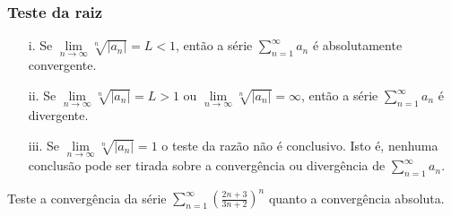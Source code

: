 \subsubsection{Teste da raiz} 
\begin{itemize}
	\item[i.]Se $\lim\limits_{n\rightarrow\infty} \sqrt[n]{\left|a_{n} \right| }=L<1$, então a série $\sum_{n=1}^{\infty}a_{n}$ é absolutamente convergente.
	\item[ii.]Se $\lim\limits_{n\rightarrow\infty} \sqrt[n]{\left|a_{n} \right| }=L>1$ ou $\lim\limits_{n\rightarrow\infty} \sqrt[n]{\left|a_{n} \right| }=\infty$, então a série $\sum_{n=1}^{\infty}a_{n}$ é divergente.
	\item[iii.]Se $\lim\limits_{n\rightarrow\infty} \sqrt[n]{\left|a_{n} \right| }=1$ o teste da razão não é conclusivo. Isto é, nenhuma conclusão pode ser tirada sobre a convergência ou divergência de $\sum_{n=1}^{\infty}a_{n}$. 
\end{itemize}
\begin{ex}
	Teste a convergência da série $\sum_{n=1}^{\infty}(\frac{2n+3}{3n+2})^{n}$ quanto a convergência absoluta. 
\end{ex}









